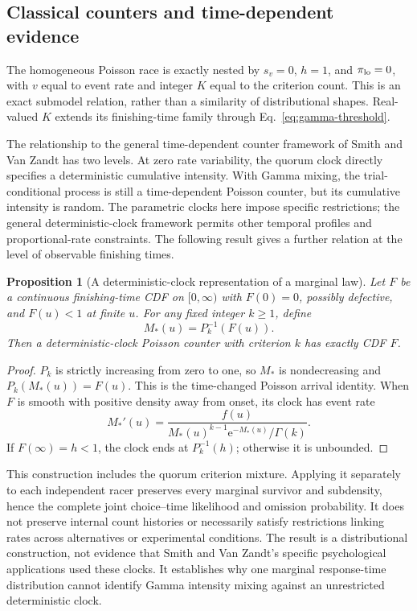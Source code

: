 \documentclass[12pt]{article}
\newcommand{\e}{\mathrm{e}}
\theoremstyle{definition}
\theoremstyle{plain}
\newtheorem{proposition}{Proposition}
\theoremstyle{remark}
\begin{document}
\subsection{Classical counters and time-dependent evidence}
The homogeneous Poisson race is exactly nested by $s_v=0$, $h=1$, and $\pi_{\rm lo}=0$, with $v$ equal to event rate and integer $K$ equal to the criterion count. This is an exact submodel relation, rather than a similarity of distributional shapes. Real-valued $K$ extends its finishing-time family through Eq.~\eqref{eq:gamma-threshold}.

The relationship to the general time-dependent counter framework of Smith and Van Zandt \cite{SmithVanZandt2000} has two levels. At zero rate variability, the quorum clock directly specifies a deterministic cumulative intensity. With Gamma mixing, the trial-conditional process is still a time-dependent Poisson counter, but its cumulative intensity is random. The parametric clocks here impose specific restrictions; the general deterministic-clock framework permits other temporal profiles and proportional-rate constraints. The following result gives a further relation at the level of observable finishing times.

\begin{proposition}[A deterministic-clock representation of a marginal law]\label{prop:mimic}
Let $F$ be a continuous finishing-time CDF on $[0,\infty)$ with $F(0)=0$, possibly defective, and $F(u)<1$ at finite $u$. For any fixed integer $k\geq1$, define
\begin{equation}
 M_*(u)=P_k^{-1}(F(u)).\label{eq:mimic-clock}
\end{equation}
Then a deterministic-clock Poisson counter with criterion $k$ has exactly CDF $F$.
\end{proposition}
\begin{proof}
$P_k$ is strictly increasing from zero to one, so $M_*$ is nondecreasing and $P_k(M_*(u))=F(u)$. This is the time-changed Poisson arrival identity. When $F$ is smooth with positive density away from onset, its clock has event rate
\begin{equation}
 M_*'(u)=\frac{f(u)}{M_*(u)^{k-1}\e^{-M_*(u)}/\Gamma(k)}.
\end{equation}
If $F(\infty)=h<1$, the clock ends at $P_k^{-1}(h)$; otherwise it is unbounded.
\end{proof}
This construction includes the quorum criterion mixture. Applying it separately to each independent racer preserves every marginal survivor and subdensity, hence the complete joint choice--time likelihood and omission probability. It does not preserve internal count histories or necessarily satisfy restrictions linking rates across alternatives or experimental conditions. The result is a distributional construction, not evidence that Smith and Van Zandt's specific psychological applications used these clocks. It establishes why one marginal response-time distribution cannot identify Gamma intensity mixing against an unrestricted deterministic clock.
\end{document}
